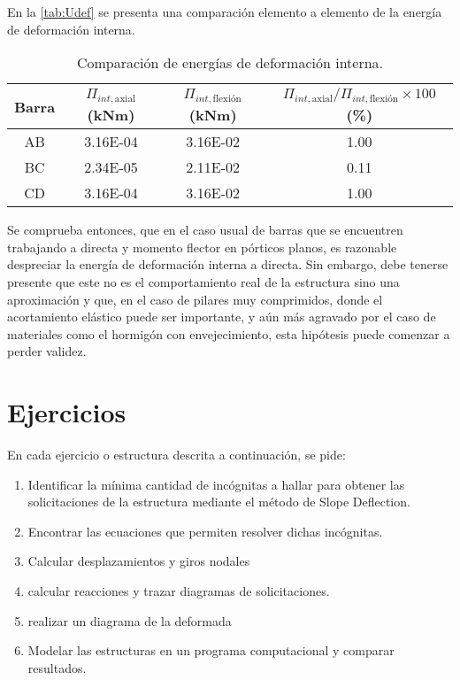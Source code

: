 En la \autoref{tab:Udef} se presenta una comparación elemento a elemento de la energía de deformación interna.

\begin{table}[htb]
	\centering
	\begin{tabular}{cccc}
		Barra & $\Pi_{int,\text{axial}}$  (kNm) & $\Pi_{int,\text{flexión}}$ (kNm) & $\Pi_{int,\text{axial}} / \Pi_{int,\text{flexión}} \times 100$  (\%) \\ \toprule
		AB             & 3.16E-04                & 3.16E-02                & 1.00                            \\
		BC             & 2.34E-05                & 2.11E-02                & 0.11                            \\
		CD             & 3.16E-04                & 3.16E-02                & 1.00                           
	\end{tabular}
	\caption{Comparación de energías de deformación interna.}
	\label{tab:Udef}
\end{table}

Se comprueba entonces, que en el caso usual de barras que se encuentren trabajando a directa y momento flector en pórticos planos, es razonable despreciar la energía de deformación interna a directa. %
%
Sin embargo, debe tenerse presente que este no es el comportamiento real de la estructura sino una aproximación y que, en el caso de pilares muy comprimidos, donde el acortamiento elástico puede ser importante, y aún más agravado por el caso de materiales como el hormigón con envejecimiento, esta hipótesis puede comenzar a perder validez. 





\newpage

\section{Ejercicios}
\setcounter{ejercicio}{0}

En cada ejercicio o estructura descrita a continuación, se pide:
%
\begin{enumerate}
  \item Identificar la mínima cantidad de incógnitas a hallar para obtener las solicitaciones de la estructura mediante el método de Slope Deflection.
  \item  Encontrar las ecuaciones que permiten resolver dichas incógnitas.
  \item  Calcular desplazamientos y giros nodales
  \item calcular reacciones y trazar diagramas de solicitaciones.
  \item realizar un diagrama de la deformada
  \item  Modelar las estructuras en un programa computacional y comparar resultados.
\end{enumerate}



